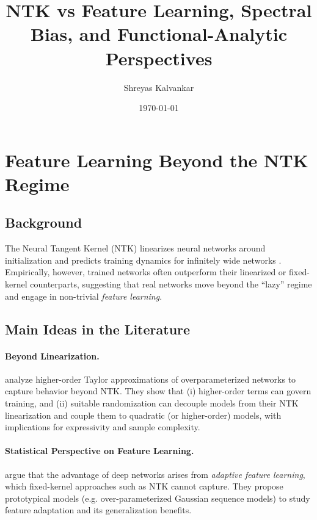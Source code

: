 \documentclass[11pt]{article}
\title{NTK vs Feature Learning, Spectral Bias, and Functional-Analytic Perspectives}
\author{Shreyas Kalvankar}
\date{\today}
\begin{document}
\maketitle

\section{Feature Learning Beyond the NTK Regime}
\subsection{Background}
The Neural Tangent Kernel (NTK) linearizes neural networks around initialization and predicts
training dynamics for infinitely wide networks \citep{jacot2018ntk,lee2019wide}. Empirically, however,
trained networks often outperform their linearized or fixed-kernel counterparts, suggesting that real
networks move beyond the ``lazy'' regime and engage in non-trivial \emph{feature learning}.

\subsection{Main Ideas in the Literature}
\paragraph{Beyond Linearization.}
\citet{bai2020beyond} analyze higher-order Taylor approximations of overparameterized networks to
capture behavior beyond NTK. They show that (i) higher-order terms can govern training,
and (ii) suitable randomization can decouple models from their NTK linearization and couple them
to quadratic (or higher-order) models, with implications for expressivity and sample complexity.

\paragraph{Statistical Perspective on Feature Learning.}
\citet{zhang2024statistical} argue that the advantage of deep networks arises from \emph{adaptive feature learning},
which fixed-kernel approaches such as NTK cannot capture. They propose prototypical models (e.g. over-parameterized Gaussian sequence models)
to study feature adaptation and its generalization benefits.
\end{document}
